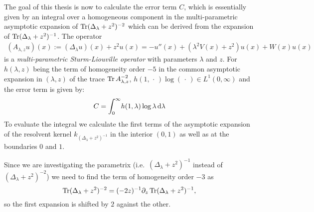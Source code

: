 The goal of this thesis is now to calculate the error term $C$, which is
essentially given by an integral over a homogeneous component in the
multi-parametric asymptotic expansion of $\Tr(\Delta_\lambda + z^2)^{-2}$ which
can be derived from the expansion of $\Tr(\Delta_\lambda + z^2)^{-1}$. The
operator
\begin{align*}
  (A_{\lambda,z}u)(x) := (\Delta_\lambda u)(x) + z^2 u(x)
           = -u''(x) + (\lambda^2 V(x) + z^2) u(x) + W(x) u(x)
\end{align*}
is a \emph{multi-parametric Sturm-Liouville operator} with parameters $\lambda$
and $z$. For $h(\lambda,z)$ being the term of homogeneity order $-5$ in the
common asymptotic expansion in $(\lambda,z)$ of the trace $\Tr
A_{\lambda,z}^{-2}$, $h(1,\,\cdot\,)\log(\,\cdot\,)\in L^1(0,\infty)$ and the
error term is given by:
\begin{align*}
  C = \Integ[\infty]{0}{\lambda}{h(1,\lambda)\log\lambda}
\end{align*}
To evaluate the integral we calculate the first terms of the asymptotic
expansion of the resolvent kernel $k_{(\Delta_\lambda + z^2)^{-1}}$ in the
interior $(0,1)$ as well as at the boundaries $0$ and $1$.

Since we are investigating the parametrix (i.e.\ $(\Delta_\lambda + z^2)^{-1}$
instead of $(\Delta_\lambda + z^2)^{-2}$) we need to find the term of
homogeneity order $-3$ as
\begin{equation*}
  \Tr(\Delta_\lambda + z^2)^{-2} = (-2z)^{-1}\partial_z\Tr(\Delta_\lambda +
  z^2)^{-1},
\end{equation*}
so the first expansion is shifted by $2$ against the other.

